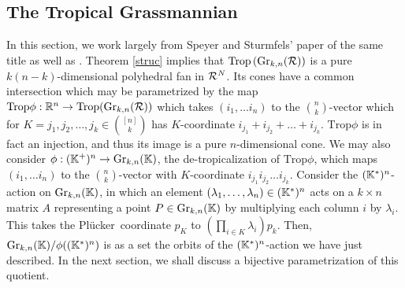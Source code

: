 \documentclass[12pt,letter]{article}
\newcommand{\gr}{\mathrm{Gr}}
\newcommand{\trop}{\mathrm{Trop}}
\newcommand{\plu}{Pl\"ucker~}
\begin{document}
\subsection{The Tropical Grassmannian}\label{tropr}
In this section, we work largely from Speyer and Sturmfels' paper \cite{SpSt04} of the same title as well as \cite[\S4.3]{MaSt15}. Theorem \ref{struc} implies that $\trop \left(\gr_{k,n}(\Rcal)\right)$ is a pure $k(n-k)$-dimensional polyhedral fan in ${\mathcal R}^{N}$. Its cones have a common intersection which may be parametrized by the map $\trop \phi: \RR^n\to \trop(\gr_{k,n}(\Rcal))$ which takes $(i_1,\hdots i_n)$ to the ${n\choose k}$-vector which for $K={j_1,j_2,\hdots,j_k}\in {[n]\choose k}$ has $K$-coordinate $i_{j_1}+i_{j_2}+\hdots +i_{j_k}$. $\trop\phi$ is in fact an injection, and thus its image is a pure $n$-dimensional cone. We may also consider $\phi:(\KK^+)^n\to \gr_{k,n}(\KK)$, the de-tropicalization of $\trop \phi$, which maps $(i_1,\hdots i_n)$ to the ${n\choose k}$-vector with $K$-coordinate $i_{j_1}i_{j_2}\hdots i_{j_k}$. Consider the $({\mathbb K}^*)^n$-action on $\gr_{k,n}(\KK)$, in which an element $(\lambda_1,\hdots,\lambda_n)\in({\mathbb K}^*)^n$ acts on a $k\times n$ matrix $A$ representing a point $P\in \gr_{k,n}(\KK)$ by multiplying each column $i$ by $\lambda_i$. This takes the \plu coordinate $p_K$ to $\left(\prod_{i\in K}\lambda_i\right)p_k$. Then, $\gr_{k,n}(\KK)/\phi((\KK^*)^n)$ is as a set the orbits of the $({\mathbb K}^*)^n$-action we have just described. In the next section, we shall discuss a bijective parametrization of this quotient.  
\end{document}

